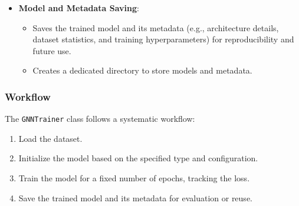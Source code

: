 {\begin{itemize}
		\item \textbf{Model and Metadata Saving}:
		\begin{itemize}
			\item Saves the trained model and its metadata (e.g., architecture details, dataset statistics, and training hyperparameters) for reproducibility and future use.
			\item Creates a dedicated directory to store models and metadata.
		\end{itemize}
	\end{itemize}
	
	\subsubsection{Workflow}
	
	The \texttt{GNNTrainer} class follows a systematic workflow:
	\begin{enumerate}
		\item Load the dataset.
		\item Initialize the model based on the specified type and configuration.
		\item Train the model for a fixed number of epochs, tracking the loss.
		\item Save the trained model and its metadata for evaluation or reuse.
	\end{enumerate}}

